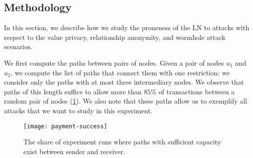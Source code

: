 \subsection{Methodology}
In this section, we describe how we study the proneness of the LN to attacks with respect to the value privacy, relationship anonymity, and wormhole attack scenarios. 

We first compute the paths between pairs of nodes.
Given a pair of nodes $u_1$ and $u_2$, 
we compute the list of paths that connect them with one restriction:
we consider only the paths with at most three intermediary nodes.
We observe that paths of this length suffice to allow more than $85\%$ of 
transactions between a random pair of nodes (\cref{fig:payment-success}).
We also note that these paths allow us to exemplify all attacks that we want to study in this experiment.
\begin{figure}
	\centering
	\texttt{[image: payment-success]}
	\caption{The share of experiment runs where paths with sufficient capacity exist between sender and receiver.}
	\label{fig:payment-success}
\end{figure}



